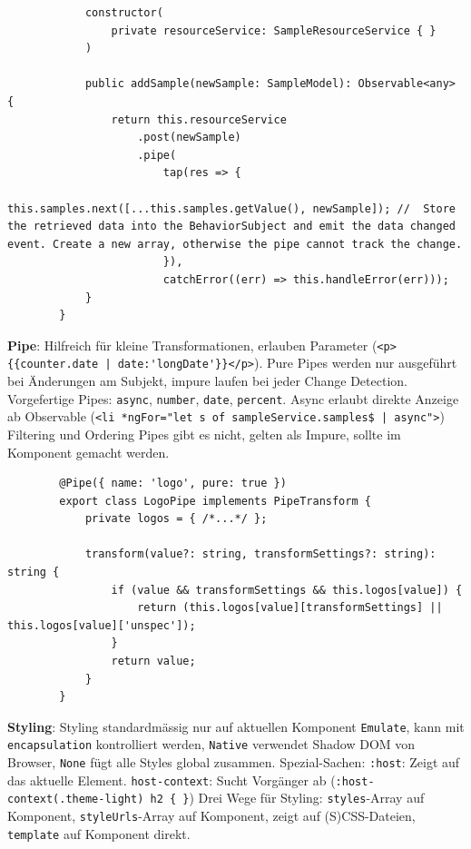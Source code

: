 \documentclass[10pt,landscape]{article}
\begin{document}
\begin{multicols}{2}
\begin{lstlisting}
            constructor(
                private resourceService: SampleResourceService { }
            )

            public addSample(newSample: SampleModel): Observable<any> {
                return this.resourceService
                    .post(newSample)
                    .pipe(
                        tap(res => {
                            this.samples.next([...this.samples.getValue(), newSample]); //  Store the retrieved data into the BehaviorSubject and emit the data changed event. Create a new array, otherwise the pipe cannot track the change.
                        }),
                        catchError((err) => this.handleError(err)));
            }
        }
        \end{lstlisting}

        \textbf{Pipe}: Hilfreich für kleine Transformationen, erlauben Parameter (\lstinline!<p>{{counter.date | date:'longDate'}}</p>!). Pure Pipes werden nur ausgeführt bei Änderungen am Subjekt, impure laufen bei jeder Change Detection.
        Vorgefertige Pipes: \lstinline{async}, \lstinline{number}, \lstinline{date}, \lstinline{percent}.
        Async erlaubt direkte Anzeige ab Observable (\lstinline!<li *ngFor="let s of sampleService.samples$ | async">!)
        Filtering und Ordering Pipes gibt es nicht, gelten als Impure, sollte im Komponent gemacht werden.

        \begin{lstlisting}
        @Pipe({ name: 'logo', pure: true })
        export class LogoPipe implements PipeTransform {
            private logos = { /*...*/ };

            transform(value?: string, transformSettings?: string): string {
                if (value && transformSettings && this.logos[value]) {
                    return (this.logos[value][transformSettings] || this.logos[value]['unspec']);
                }
                return value;
            }
        }
        \end{lstlisting}

        \textbf{Styling}: Styling standardmässig nur auf aktuellen Komponent \lstinline{Emulate}, kann mit \lstinline{encapsulation} kontrolliert werden, \lstinline{Native} verwendet Shadow DOM von Browser, \lstinline{None} fügt alle Styles global zusammen.
        Spezial-Sachen: \lstinline{:host}: Zeigt auf das aktuelle Element.
        \lstinline{host-context}: Sucht Vorgänger ab (\lstinline!:host-context(.theme-light) h2 { }!)
        Drei Wege für Styling: \lstinline{styles}-Array auf Komponent, \lstinline{styleUrls}-Array auf Komponent, zeigt auf (S)CSS-Dateien, \lstinline{template} auf Komponent direkt.


\end{multicols}
\end{document}
